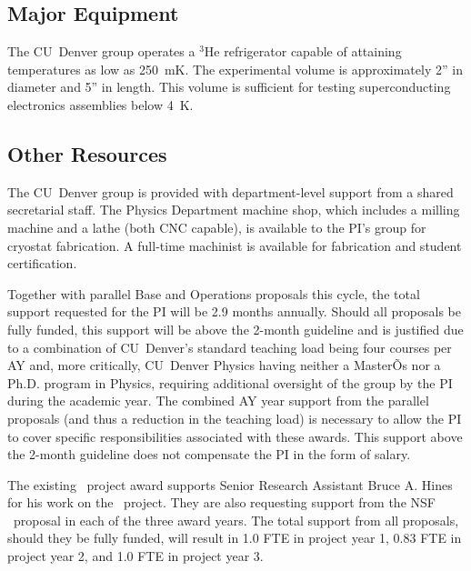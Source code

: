 \subsection{Major Equipment}
 The CU~Denver group operates a $^{3}$He refrigerator capable of attaining temperatures as low as 250~mK. The experimental volume is approximately 2'' in diameter and 5'' in length. This volume is sufficient for testing superconducting electronics assemblies below 4~K. %


\subsection{Other Resources}

The CU~Denver group is provided with department-level support from a shared secretarial staff. The Physics Department machine shop, which includes a milling machine and a lathe (both CNC capable), is available to the PI's group for cryostat fabrication. A full-time machinist is available for fabrication and student certification. 



Together with parallel Base and Operations proposals this cycle, the total support requested for the PI will be 2.9 months annually. Should all proposals be fully funded, this support will be above the 2-month guideline and is justified due to a combination of CU~Denver's standard teaching load being four courses per AY and, more critically, CU~Denver Physics having neither a MasterÕs nor a Ph.D. program in Physics, requiring additional oversight of the group by the PI during the academic year. The combined AY year support from the parallel proposals (and thus a reduction in the teaching load) is necessary to allow the PI to cover specific responsibilities associated with these awards. This support above the 2-month guideline does not compensate the PI in the form of salary.



The existing \scs\ project award supports Senior Research Assistant Bruce A. Hines for his work on the \SNOLAB\ project. They are also requesting support from the NSF \SuperCDMS\ \RnD proposal in each of the three award years. The total support from all proposals, should they be fully funded, will result in 1.0 FTE in project year 1, 0.83 FTE in project year 2, and 1.0 FTE in project year 3.


